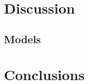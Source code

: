 \documentclass[twocolumn]{aastex631}
\begin{document}
\begin{CJK*}{UTF8}{gbsn}
\section{Discussion} \label{sec:discussion}
\subsection{Models} \label{sec:model}

\section{Conclusions} \label{sec:conclusion}





\end{CJK*}
\end{document}
